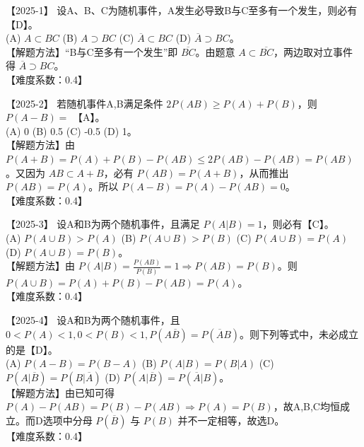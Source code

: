 \documentclass[zihao=4, a4paper, fontset=mac]{ctexart}
\begin{document}
\par\vspace{\baselineskip}

【2025-1】 设A、B、C为随机事件，A发生必导致B与C至多有一个发生，则必有【D】。\\
(A) $A\subset BC$ \quad (B) $A\supset BC$ \quad (C) $\overline{A}\subset BC$ \quad (D) $\overline{A}\supset BC$。\\
【解题方法】“B与C至多有一个发生”即 $\overline{BC}$。由题意 $A \subset \overline{BC}$，两边取对立事件得 $\overline{A} \supset BC$。\\
【难度系数：0.4】

\par\vspace{\baselineskip}

【2025-2】 若随机事件A,B满足条件 $2P(AB)\ge P(A)+P(B)$，则 $P(A-B)=$ 【A】。\\
(A) 0 \quad (B) 0.5 \quad (C) -0.5 \quad (D) 1。\\
【解题方法】由 $P(A+B)=P(A)+P(B)-P(AB) \le 2P(AB)-P(AB)=P(AB)$。又因为 $AB \subset A+B$，必有 $P(AB)=P(A+B)$，从而推出 $P(AB)=P(A)$。所以 $P(A-B)=P(A)-P(AB)=0$。\\
【难度系数：0.4】

\par\vspace{\baselineskip}

【2025-3】 设A和B为两个随机事件，且满足 $P(A|B)=1$，则必有【C】。\\
(A) $P(A\cup B)>P(A)$ \quad (B) $P(A\cup B)>P(B)$ \quad (C) $P(A\cup B)=P(A)$ \quad (D) $P(A\cup B)=P(B)$。\\
【解题方法】由 $P(A|B)=\frac{P(AB)}{P(B)}=1 \Rightarrow P(AB)=P(B)$。则 $P(A\cup B)=P(A)+P(B)-P(AB)=P(A)$。\\
【难度系数：0.4】

\par\vspace{\baselineskip}

【2025-4】 设A和B为两个随机事件，且 $0<P(A)<1, 0<P(B)<1, P(A\overline{B})=P(\overline{A}B)$。则下列等式中，未必成立的是【D】。\\
(A) $P(A-B)=P(B-A)$ \quad (B) $P(A|B)=P(B|A)$ \quad (C) $P(A|\overline{B})=P(B|\overline{A})$ \quad (D) $P(A|\overline{B})=P(\overline{A}|B)$。\\
【解题方法】由已知可得 $P(A)-P(AB)=P(B)-P(AB) \Rightarrow P(A)=P(B)$，故A,B,C均恒成立。而D选项中分母 $P(\overline{B})$ 与 $P(B)$ 并不一定相等，故选D。\\
【难度系数：0.4】
\end{document}
